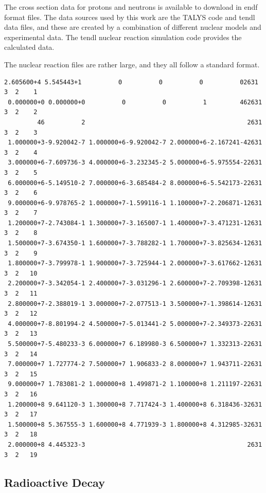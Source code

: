 The cross section data for protons and neutrons is available to download in \acrshort{endf} format files.  The data sources used by this work are the TALYS code and \acrshort{tendl} data files, and these are created by a combination of different nuclear models and experimental data.  The \acrshort{tendl} nuclear reaction simulation code provides the calculated data.

The nuclear reaction files are rather large, and they all follow a standard format.


\begin{lstlisting}[style=sPseudo,caption={Sample TENDL File}]
 2.605600+4 5.545443+1          0          0          0          02631 3  2    1
 0.000000+0 0.000000+0          0          0          1         462631 3  2    2
         46          2                                            2631 3  2    3
 1.000000+3-9.920042-7 1.000000+6-9.920042-7 2.000000+6-2.167241-42631 3  2    4
 3.000000+6-7.609736-3 4.000000+6-3.232345-2 5.000000+6-5.975554-22631 3  2    5
 6.000000+6-5.149510-2 7.000000+6-3.685484-2 8.000000+6-5.542173-22631 3  2    6
 9.000000+6-9.978765-2 1.000000+7-1.599116-1 1.100000+7-2.206871-12631 3  2    7
 1.200000+7-2.743084-1 1.300000+7-3.165007-1 1.400000+7-3.471231-12631 3  2    8
 1.500000+7-3.674350-1 1.600000+7-3.788282-1 1.700000+7-3.825634-12631 3  2    9
 1.800000+7-3.799978-1 1.900000+7-3.725944-1 2.000000+7-3.617662-12631 3  2   10
 2.200000+7-3.342054-1 2.400000+7-3.031296-1 2.600000+7-2.709398-12631 3  2   11
 2.800000+7-2.388019-1 3.000000+7-2.077513-1 3.500000+7-1.398614-12631 3  2   12
 4.000000+7-8.801994-2 4.500000+7-5.013441-2 5.000000+7-2.349373-22631 3  2   13
 5.500000+7-5.480233-3 6.000000+7 6.189980-3 6.500000+7 1.332313-22631 3  2   14
 7.000000+7 1.727774-2 7.500000+7 1.906833-2 8.000000+7 1.943711-22631 3  2   15
 9.000000+7 1.783081-2 1.000000+8 1.499871-2 1.100000+8 1.211197-22631 3  2   16
 1.200000+8 9.641120-3 1.300000+8 7.717424-3 1.400000+8 6.318436-32631 3  2   17
 1.500000+8 5.367555-3 1.600000+8 4.771939-3 1.800000+8 4.312985-32631 3  2   18
 2.000000+8 4.445323-3                                            2631 3  2   19
\end{lstlisting}








\subsection{Radioactive Decay}

